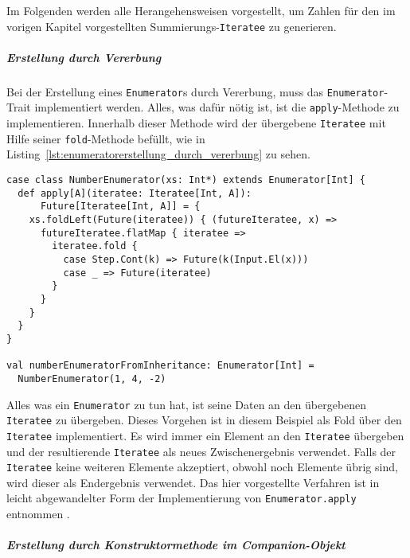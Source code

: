 \documentclass[draft=false
              ,paper=a4
              ,twoside=false
              ,fontsize=11pt
              ,headsepline
              ,BCOR10mm
              ,DIV11
              ]{scrbook}
\begin{document}
Im Folgenden werden alle Herangehensweisen vorgestellt, um Zahlen für den im vorigen Kapitel vorgestellten Summierungs-\lstinline|Iteratee| zu generieren.

\subparagraph{Erstellung durch Vererbung} %
\label{subp:enumeratorerstellung_durch_vererbung}\mbox{} %

Bei der Erstellung eines \lstinline|Enumerator|s durch Vererbung, muss das \lstinline|Enumerator|-Trait implementiert werden.
Alles, was dafür nötig ist, ist die \lstinline|apply|-Methode zu implementieren.
Innerhalb dieser Methode wird der übergebene \lstinline|Iteratee| mit Hilfe seiner \lstinline|fold|-Methode befüllt, wie in Listing~\ref{lst:enumeratorerstellung_durch_vererbung} zu sehen.

\begin{lstlisting}[caption=Erstellung eines Enumerators durch Vererbung, label=lst:enumeratorerstellung_durch_vererbung]
case class NumberEnumerator(xs: Int*) extends Enumerator[Int] {
  def apply[A](iteratee: Iteratee[Int, A]):
      Future[Iteratee[Int, A]] = {
    xs.foldLeft(Future(iteratee)) { (futureIteratee, x) =>
      futureIteratee.flatMap { iteratee =>
        iteratee.fold {
          case Step.Cont(k) => Future(k(Input.El(x)))
          case _ => Future(iteratee)
        }
      }
    }
  }
}

val numberEnumeratorFromInheritance: Enumerator[Int] =
  NumberEnumerator(1, 4, -2)
\end{lstlisting}

Alles was ein \lstinline|Enumerator| zu tun hat, ist seine Daten an den übergebenen \lstinline|Iteratee| zu übergeben.
Dieses Vorgehen ist in diesem Beispiel als Fold über den \lstinline|Iteratee| implementiert.
Es wird immer ein Element an den \lstinline|Iteratee| übergeben und der resultierende \lstinline|Iteratee| als neues Zwischenergebnis verwendet.
Falls der \lstinline|Iteratee| keine weiteren Elemente akzeptiert, obwohl noch Elemente übrig sind, wird dieser als Endergebnis verwendet.
Das hier vorgestellte Verfahren ist in leicht abgewandelter Form der Implementierung von \lstinline|Enumerator.apply| entnommen \cite[vgl.][Zeile~663 und Zeile~690]{play_enumerator_source_code}.


\subparagraph{Erstellung durch Konstruktormethode im Companion-Objekt} %
\label{subp:erstellung_durch_konstruktormethode_im_companion-object}\mbox{} %
\end{document}
